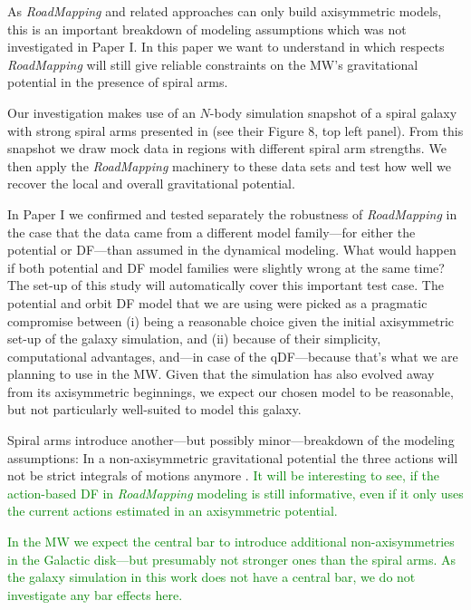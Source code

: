 \documentclass[iop,revtex4,numberedappendix,appendixfloats]{emulateapj}
\newcommand{\RM}{{\sl RoadMapping}}
\newcommand{\NEW}[1]{\textcolor{Green}{#1}}
\begin{document}
As \RM{} and related approaches can only build axisymmetric models, this is an important breakdown of modeling assumptions which was not investigated in Paper I. In this paper we want to understand in which respects \RM{} will still give reliable constraints on the MW's gravitational potential in the presence of spiral arms.

Our investigation makes use of an $N$-body simulation snapshot of a spiral galaxy with strong spiral arms presented in \citet{2013ApJ...766...34D} (see their Figure 8, top left panel). From this snapshot we draw mock data in regions with different spiral arm strengths. We then apply the \RM{} machinery to these data sets and test how well we recover the local and overall gravitational potential.

In Paper I we confirmed and tested separately the robustness of \RM{} in the case that the data came from a different model family---for either the potential or DF---than assumed in the dynamical modeling. What would happen if both potential and DF model families were slightly wrong at the same time? The set-up of this study will automatically cover this important test case. The potential and orbit DF model that we are using were picked as a pragmatic compromise between (i) being a reasonable choice given the initial axisymmetric set-up of the galaxy simulation, and (ii) because of their simplicity, computational advantages, and---in case of the qDF---because that's what we are planning to use in the MW. Given that the simulation has also evolved away from its axisymmetric beginnings, we expect our chosen model to be reasonable, but not particularly well-suited to model this galaxy.

Spiral arms introduce another---but possibly minor---breakdown of the modeling assumptions: In a non-axisymmetric gravitational potential the three actions will not be strict integrals of motions anymore \citep{2008gady.book.....B,2011A&A...527A.147M,2012A&A...548A.127M,2012MNRAS.422.1363S,2012MNRAS.421.1529G,2016ApJ...824...39V}. \NEW{It will be interesting to see, if the action-based DF in \RM{} modeling is still informative, even if it only uses the current actions estimated in an axisymmetric potential.}

\NEW{In the MW we expect the central bar to introduce additional non-axisymmetries in the Galactic disk---but presumably not stronger ones than the spiral arms. As the galaxy simulation in this work does not have a central bar, we do not investigate any bar effects here.}
\end{document}
